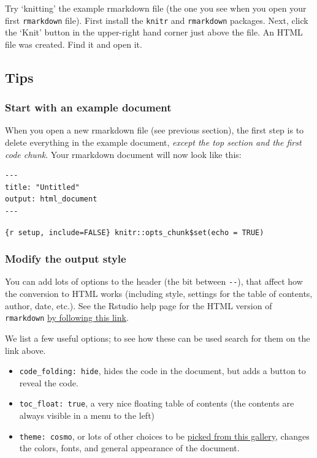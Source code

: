 \documentclass[]{book}
\providecommand{\tightlist}{%
  \setlength{\itemsep}{0pt}\setlength{\parskip}{0pt}}
\let\BeginKnitrBlock\begin \let\EndKnitrBlock\end
\begin{document}
\BeginKnitrBlock{rmdtry}
Try `knitting' the example rmarkdown file (the one you see when you open your first \texttt{rmarkdown} file). First install the \texttt{knitr} and \texttt{rmarkdown} packages. Next, click the `Knit' button in the upper-right hand corner just above the file. An HTML file was created. Find it and open it.
\EndKnitrBlock{rmdtry}

\hypertarget{tips}{%
\subsection{Tips}\label{tips}}

\hypertarget{start-with-an-example-document}{%
\subsubsection*{Start with an example document}\label{start-with-an-example-document}}

When you open a new rmarkdown file (see previous section), the first step is to delete everything in the example document, \emph{except the top section and the first code chunk}. Your rmarkdown document will now look like this:

\begin{verbatim}
---
title: "Untitled"
output: html_document
---
\end{verbatim}

\texttt{\{r\ setup,\ include=FALSE\}\ knitr::opts\_chunk\$set(echo\ =\ TRUE)}

\hypertarget{modify-the-output-style}{%
\subsubsection*{Modify the output style}\label{modify-the-output-style}}

You can add lots of options to the header (the bit between \texttt{-\/-}), that affect how the conversion to HTML works (including style, settings for the table of contents, author, date, etc.). See the Rstudio help page for the HTML version of \texttt{rmarkdown} \href{https://bookdown.org/yihui/rmarkdown/html-document.html}{by following this link}.

We list a few useful options; to see how these can be used search for them on the link above.

\begin{itemize}
\tightlist
\item
  \texttt{code\_folding:\ hide}, hides the code in the document, but adds a button to reveal the code.
\item
  \texttt{toc\_float:\ true}, a very nice floating table of contents (the contents are always visible in a menu to the left)
\item
  \texttt{theme:\ cosmo}, or lots of other choices to be \href{https://bootswatch.com/3/}{picked from this gallery}, changes the colors, fonts, and general appearance of the document.
\end{itemize}
\end{document}
